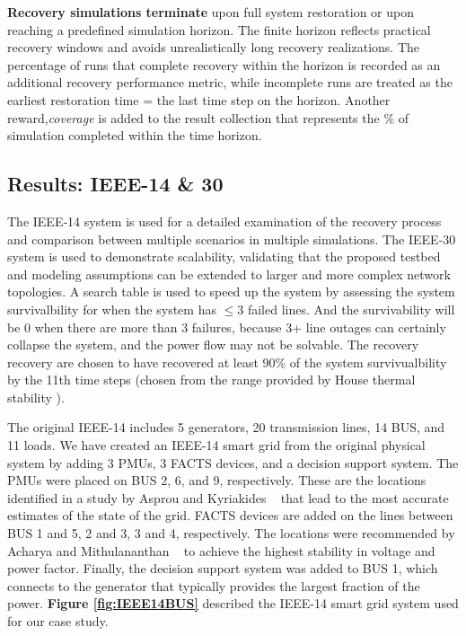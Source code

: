 \documentclass[conference]{IEEEtran}
\begin{document}
\textbf{Recovery simulations terminate} upon full system restoration or upon reaching a predefined simulation horizon. The finite horizon reflects practical recovery windows and avoids unrealistically long recovery realizations. The percentage of runs that complete recovery within the horizon is recorded as an additional recovery performance metric, while incomplete runs are treated as the earliest restoration time = the last time step on the horizon. Another reward,\emph{coverage} is added to the result collection that represents the \% of simulation completed within the time horizon. 

\subsection{Results: IEEE-14 \& 30}
The IEEE‑14 system is used for a detailed examination of the recovery process and comparison between multiple scenarios in multiple simulations. The IEEE‑30 system is used to demonstrate scalability, validating that the proposed testbed and modeling assumptions can be extended to larger and more complex network topologies. A search table is used to speed up the system by assessing the system survivalbility for when the system has $\leq 3$ failed lines. And the survivability will be 0 when there are more than 3 failures, because 3+ line outages can certainly collapse the system, and the power flow may not be solvable. The recovery recovery are chosen to have recovered at least 90\% of the system survivualbility by the 11th time steps (chosen from the range provided by House thermal stability \cite{noauthor_how_nodate}).

The original IEEE-14 includes 5 generators, 20 transmission lines, 14 BUS, and 11 loads. We have created an IEEE-14 smart grid from the original physical system by adding 3 PMUs,  3 FACTS devices, and a decision support system. The PMUs were placed on BUS 2, 6, and 9, respectively. These are the locations identified in a study by Asprou and Kyriakides ~\cite{asprou_optimal_2011} that lead to the most accurate estimates of the state of the grid. FACTS devices are added on the lines between BUS 1 and 5, 2 and 3, 3 and 4, respectively. The locations were recommended by Acharya and Mithulananthan  ~\cite{acharya_locating_2007} to achieve the highest stability in voltage and power factor. Finally, the decision support system was added to BUS 1, which connects to the generator that typically provides the largest fraction of the power. \textbf{Figure \ref{fig:IEEE14BUS}} described the IEEE-14 smart grid system used for our case study.
\end{document}
